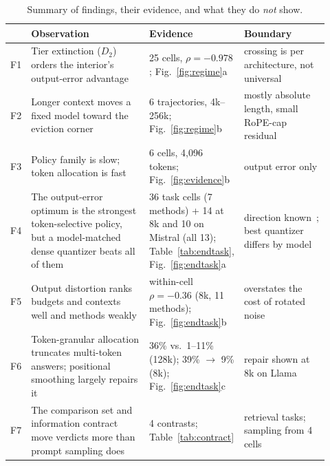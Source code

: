 \documentclass{article}
\theoremstyle{definition}
\begin{document}
\begin{table}[t]
\centering
\small
\setlength{\tabcolsep}{4pt}
\caption{Summary of findings, their evidence, and what they do \emph{not} show.}
\label{tab:findings}
\begin{tabular}{@{}p{0.03\linewidth}p{0.40\linewidth}p{0.20\linewidth}p{0.29\linewidth}@{}}
\toprule
& \textbf{Observation} & \textbf{Evidence} & \textbf{Boundary} \\
\midrule
F1 & Tier extinction ($D_2$) orders the interior's output-error advantage & 25 cells, $\rho=-0.978$; Fig.~\ref{fig:regime}a & crossing is per architecture, not universal \\
F2 & Longer context moves a fixed model toward the eviction corner & 6 trajectories, 4k--256k; Fig.~\ref{fig:regime}b & mostly absolute length, small RoPE-cap residual \\
F3 & Policy family is slow; token allocation is fast & 6 cells, 4,096 tokens; Fig.~\ref{fig:evidence}b & output error only \\
F4 & The output-error optimum is the strongest token-selective policy, but a model-matched dense quantizer beats all of them & 36 task cells (7 methods) + 14 at 8k and 10 on Mistral (all 13); Table~\ref{tab:endtask}, Fig.~\ref{fig:endtask}a & direction known~\citep{yuan2024kvbench}; best quantizer differs by model \\ %
F5 & Output distortion ranks budgets and contexts well and methods weakly & within-cell $\rho=-0.36$ (8k, 11 methods); Fig.~\ref{fig:endtask}b & overstates the cost of rotated noise \\ %
F6 & Token-granular allocation truncates multi-token answers; positional smoothing largely repairs it & 36\% vs.\ 1--11\% (128k); 39\% $\to$ 9\% (8k); Fig.~\ref{fig:endtask}c & repair shown at 8k on Llama \\ %
F7 & The comparison set and information contract move verdicts more than prompt sampling does & 4 contrasts; Table~\ref{tab:contract} & retrieval tasks; sampling from 4 cells \\ %
\bottomrule
\end{tabular}
\vspace{-2mm}
\end{table}
\end{document}
